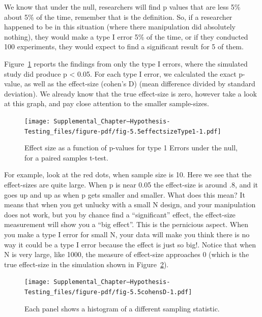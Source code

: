 \documentclass[
  letterpaper,
  DIV=11,
  numbers=noendperiod]{scrartcl}
\begin{document}
We know that under the null, researchers will find p values that are
less 5\% about 5\% of the time, remember that is the definition. So, if
a researcher happened to be in this situation (where there manipulation
did absolutely nothing), they would make a type I error 5\% of the time,
or if they conducted 100 experiments, they would expect to find a
significant result for 5 of them.

Figure~\ref{fig-5.5effectsizeType1} reports the findings from only the
type I errors, where the simulated study did produce p \textless{} 0.05.
For each type I error, we calculated the exact p-value, as well as the
effect-size (cohen's D) (mean difference divided by standard deviation).
We already know that the true effect-size is zero, however take a look
at this graph, and pay close attention to the smaller sample-sizes.

\begin{figure}

{\centering \texttt{[image: Supplemental\_Chapter---Hypothesis-Testing\_files/figure-pdf/fig-5.5effectsizeType1-1.pdf]}

}

\caption{\label{fig-5.5effectsizeType1}Effect size as a function of
p-values for type 1 Errors under the null, for a paired samples t-test.}

\end{figure}

For example, look at the red dots, when sample size is 10. Here we see
that the effect-sizes are quite large. When p is near 0.05 the
effect-size is around .8, and it goes up and up as when p gets smaller
and smaller. What does this mean? It means that when you get unlucky
with a small N design, and your manipulation does not work, but you by
chance find a ``significant'' effect, the effect-size measurement will
show you a ``big effect''. This is the pernicious aspect. When you make
a type I error for small N, your data will make you think there is no
way it could be a type I error because the effect is just so big!.
Notice that when N is very large, like 1000, the measure of effect-size
approaches 0 (which is the true effect-size in the simulation shown in
Figure~\ref{fig-5.5cohensD}).

\begin{figure}

{\centering \texttt{[image: Supplemental\_Chapter---Hypothesis-Testing\_files/figure-pdf/fig-5.5cohensD-1.pdf]}

}

\caption{\label{fig-5.5cohensD}Each panel shows a histogram of a
different sampling statistic.}

\end{figure}
\end{document}
